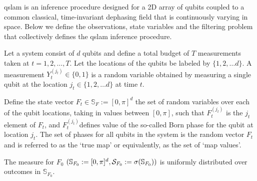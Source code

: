 qslam is an inference procedure designed for a 2D array of qubits coupled to a common classical, time-invariant dephasing field that is continuously varying in space. Below we define the observations, state variables and the filtering problem that collectively defines the qslam inference procedure. 

\begin{defn}
	Let a system consist of $d$ qubits and define a total budget of $T$ measurements taken at $t=1, 2, \hdots, T$. Let the locations of the qubits be labeled by $\{1, 2, \hdots d\}$. A measurement $Y_t^{(j_t)} \in \{0,1\}$ is a random variable obtained by measuring a single qubit at the location $j_t \in \{1, 2, \hdots d\}$ at time $t$. 
\end{defn}

\begin{defn} \label{qslam:def:Fstatevariable}
	Define the state vector $F_t \in \mathbb{S}_F := [0, \pi]^d$ the set of random variables over each of the qubit locations, taking in values between $[0, \pi]$, such that $F_t^{(j_t)}$ is the $j_t$ element of $F_t$, and $F_t^{(j_t)}$defines value of the so-called Born phase  for the qubit at location $j_t$. The set of phases for all qubits in the system is the random vector $F_t$ and is referred to as the `true map' or equivalently, as the set of `map values'.
\end{defn}

\begin{defn} The measure for $F_0$  $(\mathbb{S}_{F_0}:= [0, \pi]^d, \mathcal{S}_{F_0}:= \sigma(\mathbb{S}_{F_0}))$ is uniformly distributed over outcomes in $\mathbb{S}_{F_0}$. 
\end{defn}

